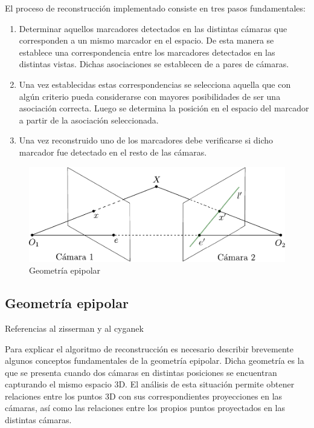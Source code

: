 El proceso de reconstrucción implementado consiste en tres pasos fundamentales:
\begin{enumerate}
\item Determinar aquellos marcadores detectados en las distintas cámaras que corresponden a un mismo marcador en el espacio. De esta manera se establece una correspondencia entre los marcadores detectados en las distintas vistas. Dichas asociaciones se establecen de a pares de cámaras.
\item Una vez establecidas estas correspondencias se selecciona aquella que con algún criterio pueda considerarse con mayores posibilidades de ser una asociación correcta. Luego se determina la posición en el espacio del marcador a partir de la asociación seleccionada.
\item Una vez reconstruido uno de los marcadores debe verificarse si dicho marcador fue detectado en el resto de las cámaras.
\end{enumerate}
\begin{figure}[H]
\begin{center}
\includegraphics[scale=0.7]{img/Reconstruccion/geometria_epipolar.pdf}
\end{center}
\caption{Geometría epipolar}
\label{fig: geometria_epipolar}
\end{figure}

\subsection{Geometría epipolar}

Referencias al zisserman y al cyganek

Para explicar el algoritmo de reconstrucción es necesario describir brevemente algunos conceptos fundamentales de la geometría epipolar.  Dicha geometría es la que se presenta cuando dos cámaras en distintas posiciones se encuentran capturando el mismo espacio 3D. El análisis de esta situación permite obtener relaciones entre los puntos 3D con sus correspondientes proyecciones en las cámaras, así como las relaciones entre los propios puntos proyectados en las distintas cámaras.\\

